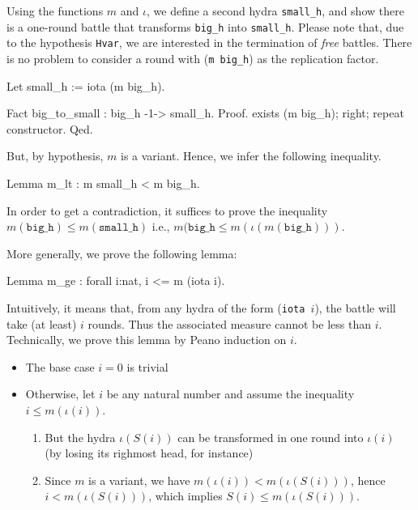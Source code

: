  Using the functions $m$ and $\iota$, we define a second hydra \texttt{small\_h}, and show
 there is a one-round battle that transforms \texttt{big\_h} into \texttt{small\_h}. Please note that,
due to the hypothesis \texttt{Hvar}, we are interested in the termination of \emph{free} battles. 
There is no problem to consider a round with (\texttt{m big\_h}) as the replication factor.

  \begin{Coqsrc}
 Let small_h := iota (m big_h).
   
 Fact big_to_small : big_h -1-> small_h.
 Proof.
      exists (m big_h); right; repeat constructor.     
 Qed.
    \end{Coqsrc}
 
But, by hypothesis, $m$ is a variant. Hence, we infer the following inequality.


 \begin{Coqsrc}
Lemma m_lt : m small_h < m big_h.
 \end{Coqsrc}

In order to get a contradiction, it suffices to  prove the inequality
$m(\texttt{big\_h}) \leq m(\texttt{small\_h})$ i.e.,  $m(\texttt{big\_h}\leq m(\iota (m(\texttt{big\_h})))$.

More generally, we prove the following lemma: 

\begin{Coqsrc}
Lemma m_ge : forall i:nat, i <= m (iota i).
\end{Coqsrc}

Intuitively, it means that, from any hydra of the form (\texttt{iota $i$}), the battle will 
take (at least) $i$ rounds. Thus the associated measure cannot be less than $i$.
Technically, we prove this lemma by Peano induction on $i$.

\begin{itemize}
\item The base case $i=0$ is trivial
\item Otherwise, let $i$ be any natural number and assume  the inequality
  $i \leq m(\iota(i))$.
  \begin{enumerate}
  \item  But the hydra $\iota(S(i))$ can be transformed in one round into
    $\iota(i)$ (by losing its righmost head, for instance)
  \item Since $m$ is a variant, we have $m(\iota(i)) < m(\iota(S(i)))$,
    hence  $i< m(\iota(S(i)))$, which implies  $S(i)\leq  m(\iota(S(i)))$.
  \end{enumerate}
\end{itemize}

